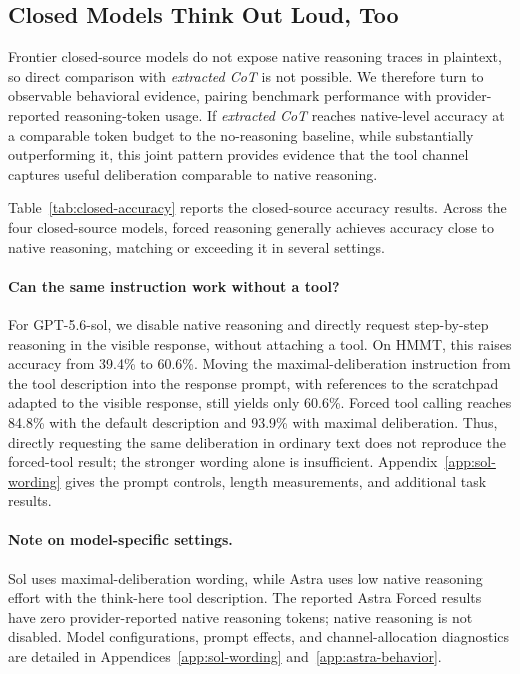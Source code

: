 \subsection{Closed Models Think Out Loud, Too}
\label{sec:closed-evidence}

Frontier closed-source models do not expose native reasoning traces in plaintext, so direct comparison with \emph{extracted CoT} is not possible.
We therefore turn to observable behavioral evidence, pairing benchmark performance with provider-reported reasoning-token usage. 
If \emph{extracted CoT} reaches native-level accuracy at a comparable token budget to the no-reasoning baseline, while substantially outperforming it, this joint pattern provides evidence that the tool channel captures useful deliberation comparable to native reasoning.


Table~\ref{tab:closed-accuracy} reports the closed-source accuracy results. Across the four closed-source models, forced reasoning generally achieves accuracy close to native reasoning, matching or exceeding it in several settings.


\paragraph{Can the same instruction work without a tool?}
For GPT-5.6-sol, we disable native reasoning and directly request step-by-step reasoning in the visible response, without attaching a tool.
On HMMT, this raises accuracy from 39.4\% to 60.6\%.
Moving the maximal-deliberation instruction from the tool description into the response prompt, with references to the scratchpad adapted to the visible response, still yields only 60.6\%.
Forced tool calling reaches 84.8\% with the default description and 93.9\% with maximal deliberation.
Thus, directly requesting the same deliberation in ordinary text does not reproduce the forced-tool result; the stronger wording alone is insufficient.
Appendix~\ref{app:sol-wording} gives the prompt controls, length measurements, and additional task results.

\paragraph{Note on model-specific settings.}
Sol uses maximal-deliberation wording, while Astra uses low native reasoning effort with the think-here tool description.
The reported Astra Forced results have zero provider-reported native reasoning tokens; native reasoning is not disabled.
Model configurations, prompt effects, and channel-allocation diagnostics are detailed in Appendices~\ref{app:sol-wording} and~\ref{app:astra-behavior}.








